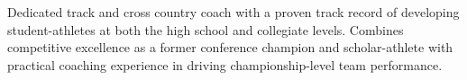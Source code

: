Dedicated track and cross country coach with a proven track record of developing student-athletes at both the high school and collegiate levels. Combines competitive excellence as a former conference champion and scholar-athlete with practical coaching experience in driving championship-level team performance.
